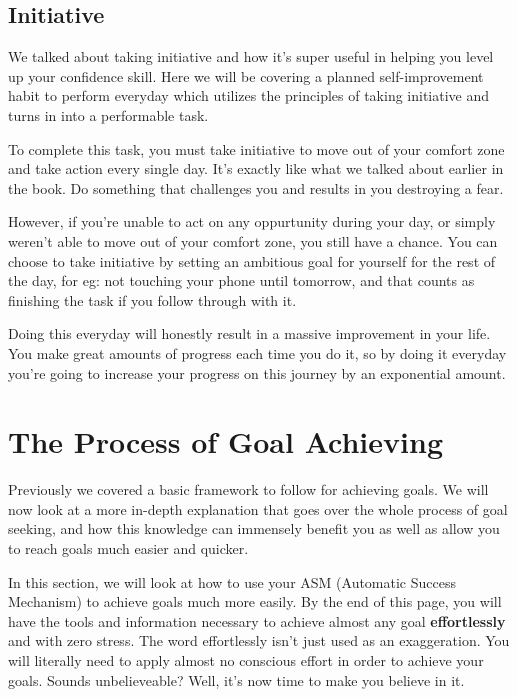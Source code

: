 \documentclass[
]{book}
\begin{document}
\hypertarget{initiative}{%
\section{Initiative}\label{initiative}}

We talked about taking initiative and how it's super useful in helping you level up your confidence skill. Here we will be covering a planned self-improvement habit to perform everyday which utilizes the principles of taking initiative and turns in into a performable task.

To complete this task, you must take initiative to move out of your comfort zone and take action every single day. It's exactly like what we talked about earlier in the book. Do something that challenges you and results in you destroying a fear.

However, if you're unable to act on any oppurtunity during your day, or simply weren't able to move out of your comfort zone, you still have a chance. You can choose to take initiative by setting an ambitious goal for yourself for the rest of the day, for eg: not touching your phone until tomorrow, and that counts as finishing the task if you follow through with it.

Doing this everyday will honestly result in a massive improvement in your life. You make great amounts of progress each time you do it, so by doing it everyday you're going to increase your progress on this journey by an exponential amount.

\hypertarget{the-process-of-goal-achieving}{%
\chapter{The Process of Goal Achieving}\label{the-process-of-goal-achieving}}

Previously we covered a basic framework to follow for achieving goals. We will now look at a more in-depth explanation that goes over the whole process of goal seeking, and how this knowledge can immensely benefit you as well as allow you to reach goals much easier and quicker.

In this section, we will look at how to use your ASM (Automatic Success Mechanism) to achieve goals much more easily. By the end of this page, you will have the tools and information necessary to achieve almost any goal \textbf{effortlessly} and with zero stress. The word effortlessly isn't just used as an exaggeration. You will literally need to apply almost no conscious effort in order to achieve your goals. Sounds unbelieveable? Well, it's now time to make you believe in it.
\end{document}
